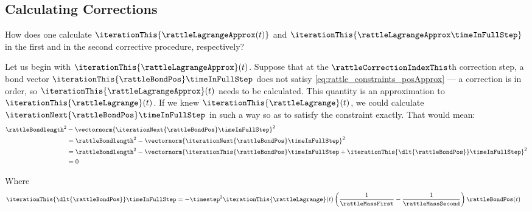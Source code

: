 \subsection{Calculating Corrections}
\label{sec:rattle_iterativeCorrection}
  \par How does one calculate $\iterationThis{\rattleLagrangeApprox(t)}$ and $\iterationThis{\rattleLagrangeApprox\timeInFullStep}$ in the first and in the second corrective procedure, respectively?
  \par Let us begin with $\iterationThis{\rattleLagrangeApprox}(t)$. Suppose that at the $\rattleCorrectionIndexThis$th correction step, a bond vector $\iterationThis{\rattleBondPos}\timeInFullStep$ does not satisy  \ref{eq:rattle_constraints_posApprox} --- a correction is in order, so $\iterationThis{\rattleLagrangeApprox}(t)$ needs to be calculated. This quantity is an approximation to $\iterationThis{\rattleLagrange}(t)$. If we knew $\iterationThis{\rattleLagrange}(t)$, we could calculate $\iterationNext{\rattleBondPos}\timeInFullStep$ in such a way so as to satisfy the constraint exactly. That would mean:
  \begin{align*}
    \rattleBondlength^2
    &- \vectornorm{\iterationNext{\rattleBondPos}\timeInFullStep}^2 \\
    &= \rattleBondlength^2
      - \vectornorm{\iterationNext{\rattleBondPos}\timeInFullStep}^2 \\
    &= \rattleBondlength^2
      - \vectornorm{
          \iterationThis{\rattleBondPos}\timeInFullStep
          + \iterationThis{\dlt{\rattleBondPos}}\timeInFullStep
        }^2 \\
    &= 0
  \end{align*}
  \par Where
  \begin{align*}
    \iterationThis{\dlt{\rattleBondPos}}\timeInFullStep
      &= - \timestep^2
        \iterationThis{\rattleLagrange}(t)
        \left(
          \frac{1}{\rattleMassFirst} - \frac{1}{\rattleMassSecond}
        \right)
        \rattleBondPos(t)
  \end{align*}
